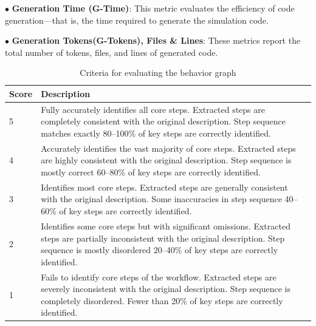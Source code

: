 \documentclass{article}
\theoremstyle{definition}
\theoremstyle{theorem}
\theoremstyle{proof}
\theoremstyle{remark}
\begin{document}
    $\bullet$ \textbf{Generation Time (G-Time)}: This metric evaluates the efficiency of code generation—that is, the time required to generate the simulation code.

    $\bullet$ \textbf{Generation Tokens(G-Tokens), Files \& Lines}: 
    These metrics report the total number of tokens, files, and lines of generated code.

    
    \begin{table}[t]
    \centering
    \caption{Criteria for evaluating the behavior graph}
    \renewcommand\arraystretch{1.2}
    \label{cre:bg}
    \begin{tabular}{m{}<{\centering}|
    m{12.0cm}<{\raggedright}}
    \hline\hline
    \textbf{Score} & \textbf{Description} \\
    \hline
    5 &  Fully accurately identifies all core steps. Extracted steps are completely consistent with the original description. Step sequence matches exactly 80–100\% of key steps are correctly identified.\\\hline
    4 &  Accurately identifies the vast majority of core steps. Extracted steps are highly consistent with the original description. Step sequence is mostly correct 60–80\% of key steps are correctly identified. \\\hline
    3 &  Identifies most core steps. Extracted steps are generally consistent with the original description. Some inaccuracies in step sequence 40–60\% of key steps are correctly identified. \\\hline
    2 &  Identifies some core steps but with significant omissions. Extracted steps are partially inconsistent with the original description. Step sequence is mostly disordered 20–40\% of key steps are correctly identified. \\\hline
    1 & Fails to identify core steps of the workflow. Extracted steps are severely inconsistent with the original description. Step sequence is completely disordered. Fewer than 20\% of key steps are correctly identified. \\
    \hline\hline
    \end{tabular}
    \end{table}
\end{document}
